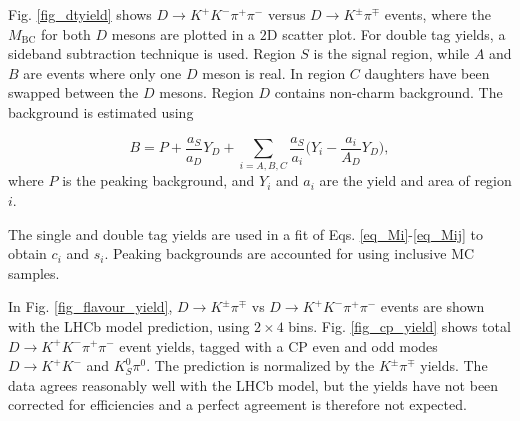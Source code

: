 \documentclass[12pt, a4paper, notitlepage, onecolumn]{article}
\begin{document}
Fig. \ref{fig_dtyield} shows $D\to K^+K^-\pi^+\pi^-$ versus $D\to K^\pm\pi^\mp$ events, where the $M_\text{BC}$ for both $D$ mesons are plotted in a $2$D scatter plot. For double tag yields, a sideband subtraction technique is used. Region $S$ is the signal region, while $A$ and $B$ are events where only one $D$ meson is real. In region $C$ daughters have been swapped between the $D$ mesons. Region $D$ contains non-charm background. The background is estimated using

\begin{equation*}
  B = P + \frac{a_S}{a_D}Y_D + \sum_{i = A, B, C}\frac{a_S}{a_i}\Big(Y_i - \frac{a_i}{A_D}Y_D\Big),
\end{equation*}
where $P$ is the peaking background, and $Y_i$ and $a_i$ are the yield and area of region $i$.

The single and double tag yields are used in a fit of Eqs. \eqref{eq_Mi}-\eqref{eq_Mij} to obtain $c_i$ and $s_i$. Peaking backgrounds are accounted for using inclusive MC samples.

In Fig. \ref{fig_flavour_yield}, $D\to K^\pm\pi^\mp$ vs $D\to K^+K^-\pi^+\pi^-$ events are shown with the LHCb model prediction, using $2\times 4$ bins. Fig. \ref{fig_cp_yield} shows total $D\to K^+K^-\pi^+\pi^-$ event yields, tagged with a CP even and odd modes $D\to K^+K^-$ and $K_S^0\pi^0$. The prediction is normalized by the $K^\pm\pi^\mp$ yields. The data agrees reasonably well with the LHCb model, but the yields have not been corrected for efficiencies and a perfect agreement is therefore not expected.
\end{document}
